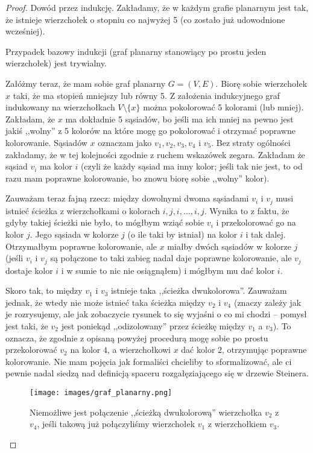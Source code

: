             \begin{proof}
                Dowód przez indukcję. Zakładamy, że w każdym grafie planarnym jest tak, że istnieje wierzchołek o stopniu co najwyżej 5 (co zostało już udowodnione wcześniej). 

                Przypadek bazowy indukcji (graf planarny stanowiący po prostu jeden wierzchołek) jest trywialny. 

                Załóżmy teraz, że mam sobie graf planarny $G = (V,E)$. Biorę sobie wierzchołek $x$ taki, że ma stopień mniejszy lub równy 5. Z założenia indukcyjnego graf indukowany na wierzchołkach $V \setminus \{x\}$ można pokolorować 5 kolorami (lub mniej). Zakładam, że $x$ ma dokładnie 5 sąsiadów, bo jeśli ma ich mniej na pewno jest jakiś ,,wolny'' z 5 kolorów na które mogę go pokolorować i otrzymać poprawne kolorowanie. Sąsiadów $x$ oznaczam jako $v_1, v_2, v_3, v_4$ i $v_5$. Bez straty ogólności zakładamy, że w tej kolejności zgodnie z ruchem wskazówek zegara. Zakładam że sąsiad $v_i$ ma kolor $i$ (czyli że każdy sąsiad ma inny kolor; jeśli tak nie jest, to od razu mam poprawne kolorowanie, bo znowu biorę sobie ,,wolny'' kolor). 

                Zauważam teraz fajną rzecz: między dowolnymi dwoma sąsiadami $v_i$ i $v_j$ musi istnieć ścieżka z wierzchołkami o kolorach $i, j, i, \dots, i, j$. Wynika to z faktu, że gdyby takiej ścieżki nie było, to mógłbym wziąć sobie $v_i$ i przekolorować go na kolor $j$. Jego sąsiada w kolorze $j$ (o ile taki by istniał) na kolor $i$ i tak dalej. Otrzymałbym poprawne kolorowanie, ale $x$ miałby dwóch sąsiadów w kolorze $j$ (jeśli $v_i$ i $v_j$ są połączone to taki zabieg nadal daje poprawne kolorowanie, ale $v_j$ dostaje kolor $i$ i w sumie to nic nie osiągnąłem) i mógłbym mu dać kolor $i$. 

                Skoro tak, to między $v_1$ i $v_3$ istnieje taka ,,ścieżka dwukolorowa''. Zauważam jednak, że wtedy nie może istnieć taka ścieżka między $v_2$ i $v_4$ (znaczy zależy jak je rozrysujemy, ale jak zobaczycie rysunek to się wyjaśni o co mi chodzi -- pomysł jest taki, że $v_2$ jest poniekąd ,,odizolowany'' przez ścieżkę między $v_1$ a $v_3$). To oznacza, że zgodnie z opisaną powyżej procedurą mogę sobie po prostu przekolorować $v_2$ na kolor $4$, a wierzchołkowi $x$ dać kolor $2$, otrzymując poprawne kolorowanie. Nie mam pojęcia jak formaliści chcieliby to sformalizować, ale ci pewnie nadal siedzą nad definicją spaceru rozgałęziającego się w drzewie Steinera. 

                \begin{figure}[H]
                    \centering
                    \texttt{[image: images/graf\_planarny.png]}
                    \caption{Niemożliwe jest połączenie ,,ścieżką dwukolorową'' wierzchołka $v_2$ z $v_4$, jeśli takową już połączyliśmy wierzchołek $v_1$ z wierzchołkiem $v_3$.}
                \end{figure}
            
            \end{proof}

